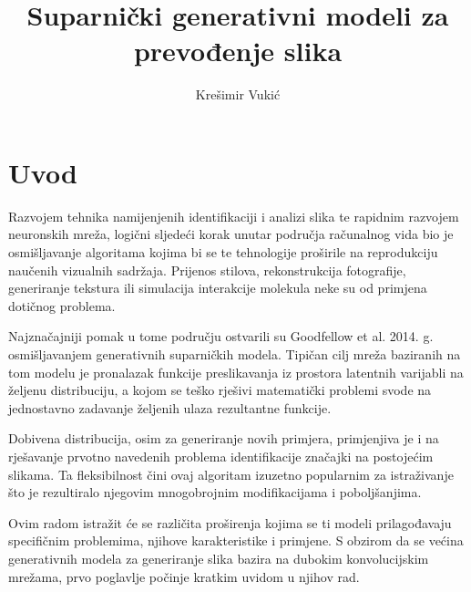 \documentclass[lmodern, utf8, seminar]{fer}
\begin{document}
\nocite{*}



\title{Suparnički generativni modeli za prevođenje slika}

\author{Krešimir Vukić}

\maketitle


\tableofcontents




\chapter{Uvod}
Razvojem tehnika namijenjenih identifikaciji i analizi slika te rapidnim razvojem neuronskih mreža, logični sljedeći korak unutar područja računalnog vida bio je osmišljavanje algoritama kojima bi se te tehnologije proširile na reprodukciju naučenih vizualnih sadržaja. 
Prijenos stilova, rekonstrukcija fotografije, generiranje tekstura ili simulacija interakcije molekula neke su od primjena dotičnog problema.
\newline

Najznačajniji pomak u tome području ostvarili su Goodfellow et al. 2014. g. \cite{goodfellow2014generative} osmišljavanjem generativnih suparničkih modela. Tipičan cilj mreža baziranih na tom modelu je pronalazak funkcije preslikavanja iz prostora latentnih varijabli na željenu distribuciju, a kojom se teško rješivi matematički problemi svode na jednostavno zadavanje željenih ulaza rezultantne funkcije.
\newline

Dobivena distribucija, osim za generiranje novih primjera, primjenjiva je i na rješavanje prvotno navedenih problema identifikacije značajki na postojećim slikama. Ta fleksibilnost čini ovaj algoritam izuzetno popularnim za istraživanje što je rezultiralo njegovim mnogobrojnim modifikacijama i poboljšanjima.
\newline

Ovim radom istražit će se različita proširenja kojima se ti modeli prilagođavaju specifičnim problemima, njihove karakteristike i primjene. S obzirom da se većina  generativnih modela za generiranje slika bazira na dubokim konvolucijskim mrežama, prvo poglavlje počinje kratkim uvidom u njihov rad.


\end{document}

